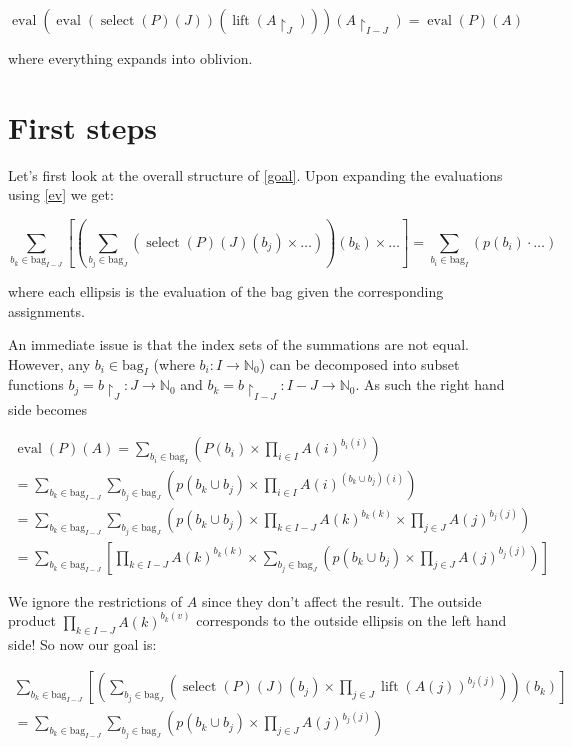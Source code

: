 \documentclass[]{article}
\DeclareMathOperator{\eval}{eval}
\DeclareMathOperator{\select}{select}
\DeclareMathOperator{\lift}{lift}
\newcommand{\bag}[1]{\mathrm{bag}_{#1}}
\begin{document}
\[
  \eval(\eval(\select(P)(J))(\lift(A{\restriction_{J}})))(A{\restriction_{I-J}}) = \eval(P)(A) \tag{goal}\label{goal}
\]

where everything expands into oblivion.

\section{First steps}

Let's first look at the overall structure of \eqref{goal}. Upon expanding the evaluations using \eqref{ev} we get:

\[
  \sum_{b_k \in \bag{I-J}} \left[
     \left(\sum_{b_j \in \bag{J}} (
       \select(P)(J)(b_j)
     \times\dots)\right)(b_k)
  \times\dots\right] = \sum_{b_i \in \bag{I}} \left(p(b_i) \cdot \dots\right)
\]

where each ellipsis is the evaluation of the bag given the corresponding assignments.

An immediate issue is that the index sets of the summations are not equal. However, any $b_i \in \bag{I}$ (where $b_i: I\to\mathbb{N}_0$) can be decomposed into subset functions $b_j = b{\restriction_{J}}: J \to \mathbb{N}_0$ and $b_k = b{\restriction_{I-J}} : {I-J} \to \mathbb{N}_0$. As such the right hand side becomes

\begin{multline*}
  \eval(P)(A) = \sum_{b_i \in \bag{I}}\left(P(b_i) \times \prod_{i \in I}{A(i)^{b_i(i)}}\right) \\
              = \sum_{b_k \in \bag{I-J}} \sum_{b_j \in \bag{J}}
       \left(p(b_k \cup b_j) \times \prod_{i \in I}{A(i)^{(b_k \cup b_j)(i)}}\right) \\
              = \sum_{b_k \in \bag{I-J}} \sum_{b_j \in \bag{J}}
       \left(p(b_k \cup b_j) \times \prod_{k \in I-J}{A(k)^{b_k(k)}} \times \prod_{j \in J}{A(j)^{b_j(j)}}\right) \\
              = \sum_{b_k \in \bag{I-J}} \left[\prod_{k \in I-J}{A(k)^{b_k(k)}} \times \sum_{b_j \in \bag{J}}
       \left(p(b_k \cup b_j) \times \prod_{j \in J}{A(j)^{b_j(j)}}\right)\right]
\end{multline*}

We ignore the restrictions of $A$ since they don't affect the result. The outside product $\prod_{k \in I-J}{A(k)^{b_k(v)}}$ corresponds to the outside ellipsis on the left hand side! So now our goal is:

\begin{multline} \label{goal2}
  \sum_{b_k \in \bag{I-J}} \left[\left(\sum_{b_j \in \bag{J}} \left(
       \select(P)(J)(b_j)
     \times \prod_{j \in J}{\lift\left(A(j)\right)^{b_j(j)}}\right) \right)(b_k)\right] \\
  = \sum_{b_k \in \bag{I-J}} \sum_{b_j \in \bag{J}}
       \left(p(b_k \cup b_j) \times \prod_{j \in J}{A(j)^{b_j(j)}}\right)
\end{multline}
\end{document}
